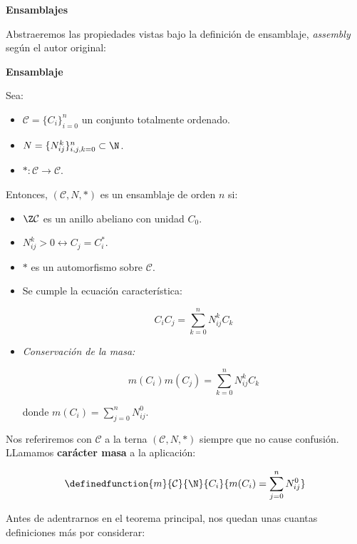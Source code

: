 \documentclass[a5paper]{article}
\renewcommand{\C}{\mathcal{C}}
\begin{document}
\newpage
{
\begin{center}{\bf Ensamblajes}\end{center}

Abstraeremos las propiedades vistas bajo la definición de ensamblaje, {\it assembly} según el autor original:

{\bf Ensamblaje}

Sea:
\begin{itemize}

\item $\C = \{C_i\}_{i=0}^n$ un conjunto totalmente ordenado.
\item $N = \{N_{ij}^k\}_{i,j,k=0}^n \subset \N$.

\item $* :  \C \longrightarrow \C $.

\end{itemize}

Entonces, $(\C,N,*)$ es un ensamblaje de orden $n$ si:
\begin{itemize}

\item $\Z\C$ es un anillo abeliano con unidad $C_0$.

\item $N_{ij}^k > 0 \leftrightarrow C_j = C_i^*$.

\item $*$ es un automorfismo sobre $\C$.

\item Se cumple la ecuación característica:

$$ C_iC_j = \sum_{k=0}^n N_{ij}^kC_k $$

\item {\it Conservación de la masa:}

$$ m(C_i)m(C_j) = \sum_{k=0}^n N_{ij}^kC_k $$

donde $m(C_i) = \displaystyle\sum_{j=0}^n N_{ij}^0$.

\end{itemize}

Nos referiremos con $\C$ a la terna $(\C,N,*)$ siempre que no cause confusión.\\

LLamamos {\bf carácter masa } a la aplicación:

$$ \definedfunction{ m }{ \C }{ \N }{ C_i }{ m(C_i) = \displaystyle\sum_{j=0}^n N_{ij}^0 }$$

}
\newpage
Antes de adentrarnos en el teorema principal, nos quedan unas cuantas definiciones más por considerar:
\end{document}

